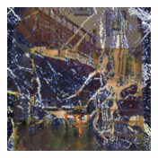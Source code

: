 \begin{figure}[]
\begin{subfigure}{\textwidth}
\begin{subfigure}{0.19\textwidth}
            \caption*{}
        \end{subfigure}
        \hfill
        \begin{subfigure}{0.19\textwidth}
            \centering
            \includegraphics[width=\textwidth]{images/04-experiment03/staircase_illum/marble/pixel_proj.jpg}
            \caption*{}
        \end{subfigure}


\end{subfigure}
\end{figure}
